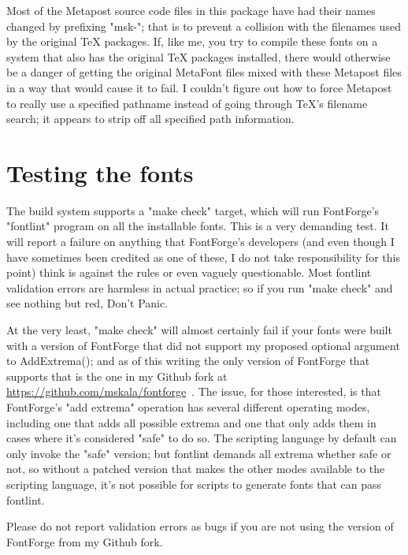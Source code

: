 \documentclass{article}
\begin{document}
Most of the Metapost source code files in this package
have had their names changed by prefixing "msk-"; that is to prevent a
collision with the filenames used by the original TeX packages.  If, like
me, you try to compile these fonts on a system that also has the original
TeX packages installed, there would otherwise be a danger of getting the
original MetaFont files mixed with these Metapost files in a way that would
cause it to fail.  I couldn't figure out how to force Metapost to really
use a specified pathname instead of going through TeX's filename search; it
appears to strip off all specified path information.

\section{Testing the fonts}

The build system supports a "make check" target, which will run FontForge's
"fontlint" program on all the installable fonts.  This is a very demanding
test.  It will report a failure on anything that FontForge's developers (and
even though I have sometimes been credited as one of these, I do not take
responsibility for this point) think is against the rules or even vaguely
questionable.  Most fontlint validation errors are harmless in actual
practice; so if you run "make check" and see nothing but red, Don't Panic.

At the very least, "make check" will almost certainly fail if your fonts
were built with a version of FontForge that did not support my proposed
optional argument to AddExtrema(); and as of this writing the only version
of FontForge that supports that is the one in my Github fork at
\url{https://github.com/mskala/fontforge}~.  The issue, for those
interested, is that FontForge's "add extrema" operation has several
different operating modes, including one that adds all possible extrema and
one that only adds them in cases where it's considered "safe" to do so.  The
scripting language by default can only invoke the "safe" version; but
fontlint demands all extrema whether safe or not, so without a patched
version that makes the other modes available to the scripting language, it's
not possible for scripts to generate fonts that can pass fontlint.

Please do not report validation errors as bugs if you are not using the
version of FontForge from my Github fork.
\end{document}
